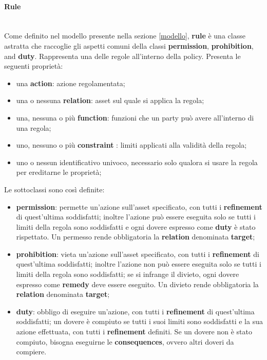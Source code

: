 \documentclass[12pt,a4paper,twoside]{book}
\begin{document}
\paragraph{Rule}\mbox{}\\
Come definito nel modello presente nella sezione \ref{modello}, \textbf{rule} è una classe astratta che raccoglie gli aspetti comuni della classi  \textbf{permission}, \textbf{prohibition}, and \textbf{duty}. Rappresenta una delle regole all'interno della policy. Presenta le seguenti proprietà:
\begin{itemize}
	\item una \textbf{action}: azione regolamentata;
	\item una o nessuna \textbf{relation}: asset sul quale si applica la regola;
	\item una, nessuna o più \textbf{function}: funzioni che un party può avere all'interno di una regola;
	\item uno, nessuno o più \textbf{constraint }: limiti applicati alla validità della regola;
	\item uno o nessun identificativo univoco, necessario solo qualora si usare la regola per ereditarne le proprietà;
\end{itemize}
Le sottoclassi sono così definite:
\begin{itemize}
	\item \textbf{permission}: permette un'azione sull'asset specificato, con tutti i \textbf{refinement} di quest'ultima soddisfatti; inoltre l'azione può essere eseguita solo se tutti i limiti della regola sono soddisfatti e ogni dovere espresso come \textbf{duty} è stato rispettato. Un permesso rende obbligatoria la \textbf{relation} denominata \textbf{target};
	\item \textbf{prohibition}: vieta un'azione sull'asset specificato, con tutti i \textbf{refinement} di quest'ultima soddisfatti; inoltre l'azione non può essere eseguita solo se tutti i limiti della regola sono soddisfatti; se si infrange il divieto, ogni dovere espresso come \textbf{remedy} deve essere eseguito. Un divieto rende obbligatoria la \textbf{relation} denominata \textbf{target};
	\item \textbf{duty}: obbligo di eseguire un'azione, con tutti i \textbf{refinement} di quest'ultima soddisfatti; un dovere è compiuto se tutti i suoi limiti sono soddisfatti e la sua azione effettuata, con tutti i \textbf{refinement} definiti. Se un dovere non è stato compiuto, bisogna eseguirne le \textbf{consequences}, ovvero altri doveri da compiere.
\end{itemize}
\end{document}
